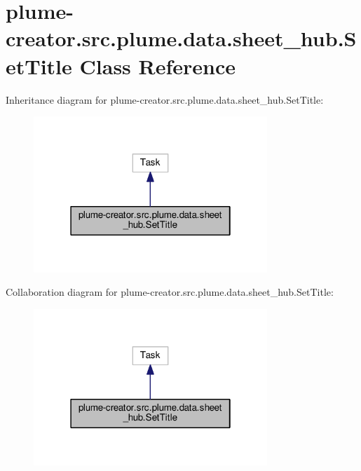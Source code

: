 \hypertarget{classplume-creator_1_1src_1_1plume_1_1data_1_1sheet__hub_1_1_set_title}{}\section{plume-\/creator.src.\+plume.\+data.\+sheet\+\_\+hub.\+Set\+Title Class Reference}
\label{classplume-creator_1_1src_1_1plume_1_1data_1_1sheet__hub_1_1_set_title}


Inheritance diagram for plume-\/creator.src.\+plume.\+data.\+sheet\+\_\+hub.\+Set\+Title\+:\nopagebreak
\begin{figure}[H]
\begin{center}
\leavevmode
\includegraphics[width=250pt]{classplume-creator_1_1src_1_1plume_1_1data_1_1sheet__hub_1_1_set_title__inherit__graph}
\end{center}
\end{figure}


Collaboration diagram for plume-\/creator.src.\+plume.\+data.\+sheet\+\_\+hub.\+Set\+Title\+:\nopagebreak
\begin{figure}[H]
\begin{center}
\leavevmode
\includegraphics[width=250pt]{classplume-creator_1_1src_1_1plume_1_1data_1_1sheet__hub_1_1_set_title__coll__graph}
\end{center}
\end{figure}
